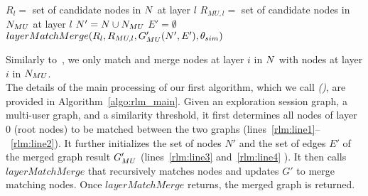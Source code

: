  \begin{algorithm}[t]
	\caption{\rlm($\sessionGraph$,$\usersGraph$, $\thetaFuse$)}
	 \label{algo:rlm_main}
	$R_l= $ set of candidate nodes in $N$ at layer $l$ \;   \label{rlm:line1}
	$R_{MU,l} = $ set of candidate nodes in $N_{MU}$ at layer $l$ \;    \label{rlm:line2}
	 $N' = N \cup N_{MU}$ \;   \label{rlm:line3}
	 $E' = \emptyset$\;  \label{rlm:line4}
	$layerMatchMerge(R_l, R_{MU,l}, G_{MU}'(N',E'), \theta_{sim})$\;
        \;
  \end{algorithm}
  
Similarly to~\cite{schulz:vissoft18}, we only match and merge nodes at layer $i$  in $N$ with nodes at layer $i$ in $N_{MU}$.\\
The details of the main processing of our first algorithm, which we call \emph{\rlmLong{} (\rlm)}, are provided in Algorithm~\ref{algo:rlm_main}. Given an exploration session graph, a multi-user graph, and a similarity threshold, it first determines all nodes of layer 0 (root nodes) to be matched between the two graphs (lines~\ref{rlm:line1}--~\ref{rlm:line2}). It further initializes the set of nodes $N'$  and the set of edges $E'$ of the merged graph result $G_{MU}'$ (lines~\ref{rlm:line3} and~\ref{rlm:line4} ). It then calls $layerMatchMerge$ that recursively matches nodes and updates $G'$ to merge matching nodes. Once $layerMatchMerge$ returns, the merged graph is returned. 



